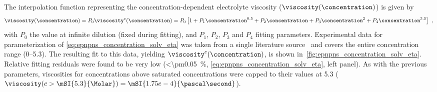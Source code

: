 The interpolation function representing the concentration-dependent electrolyte viscosity ($\viscosity
(\concentration)$) is given by
%
\begin{align}\label{eq:epnpns_concentration_solv_eta}
  \viscosity (\concentration) = P_0 \viscosity^c (\concentration) =
  P_0 \left[ 1
            + P_1 \concentration^{0.5}
            + P_2 \concentration
            + P_3 \concentration^{2}
            + P_4 \concentration^{3.5}
      \right]
  \text{ ,}
\end{align}
%
with $P_0$ the value at infinite dilution (fixed during fitting), and $P_1$, $P_2$, $P_3$ and $P_4$ fitting
parameters. Experimental data for parameterization of \cref{eq:epnpns_concentration_solv_eta} was taken from a
single literature source~\cite{Hai-Lang-1996} and covers the entire concentration range
(\SIrange{0}{5.3}{\Molar}). The resulting fit to this data, yielding $\viscosity^c (\concentration)$, is shown
in~\cref{fig:epnpns_concentration_solv_eta}. Relative fitting residuals were found to be very low
(\SI{<\pm0.05}{\percent}, \cref{eq:epnpns_concentration_solv_eta}, left panel). As with the previous
parameters, viscosities for concentrations above saturated concentrations were capped to their values at
\SI{5.3}{\Molar} (\ie~$\viscosity (c > \mSI{5.3}{\Molar}) = \mSI{1.75e-4}{\pascal\second}$).

